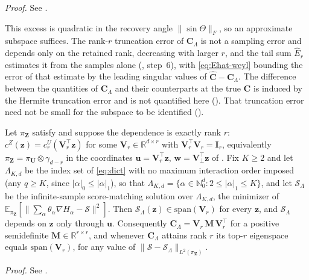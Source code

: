 \documentclass[review,hidelinks,onefignum,onetabnum]{siamart251216}
\newcommand{\RR}{\mathbb{R}}
\newcommand{\NN}{\mathbb{N}}
\newcommand{\EE}{\mathbb{E}}
\newcommand{\gauss}{\gamma}
\newcommand{\mC}{\bm{C}}
\newcommand{\hmC}{\widehat{\bm{C}}}
\newcommand{\mV}{\bm{V}}
\newcommand{\mI}{\bm{I}}
\newcommand{\vz}{\bm{z}}
\newcommand{\vZ}{\bm{Z}}
\newcommand{\vu}{\bm{u}}
\newcommand{\vU}{\bm{U}}
\newcommand{\vw}{\bm{w}}
\newcommand{\scS}{\mathcal{S}}
\begin{document}
\emph{Proof.} See .

This excess is quadratic in the recovery angle $\|\sin\Theta\|_F$, so an approximate subspace suffices. The rank-$r$ truncation error of $\mC_\Lambda$ is not a sampling error and depends only on the retained rank, decreasing with larger $r$, and the tail sum $\widehat E_r$ estimates it from the samples alone (, step~6), with \eqref{eq:Ehat-weyl} bounding the error of that estimate by the leading singular values of $\hmC - \mC_\Lambda$. The difference between the quantities of $\mC_\Lambda$ and their counterparts at the true $\mC$ is induced by the Hermite truncation error and is not quantified here (). That truncation error need not be small for the subspace to be identified ().

\begin{lemma}
\label{lem:pilot-subspace}
Let $\pi_{\vZ}$ satisfy  and suppose the dependence is exactly rank $r$: $c^{Z}(\vz) = c_r^{U}(\mV_r^\top\vz)$ for some $\mV_r \in \RR^{d\times r}$ with $\mV_r^\top\mV_r = \mI_r$, equivalently $\pi_{\vZ} = \pi_{\vU}\otimes\gauss_{d-r}$ in the coordinates $\vu = \mV_r^\top\vz$, $\vw = \mV_\perp^\top\vz$ of . Fix $K \geq 2$ and let $\Lambda_{K,d}$ be the index set of \eqref{eq:dict} with no maximum interaction order imposed (any $q \geq K$, since $|\alpha|_0 \le |\alpha|_1$), so that $\Lambda_{K,d} = \{\alpha \in \NN_0^d : 2 \le |\alpha|_1 \le K\}$, and let $\scS_\Lambda$ be the infinite-sample score-matching solution over $\Lambda_{K,d}$, the minimizer of $\EE_{\pi_{\vZ}}[\|\sum_{\alpha}\theta_\alpha\nabla H_\alpha - \scS\|^2]$. Then $\scS_\Lambda(\vz) \in \mathrm{span}(\mV_r)$ for every $\vz$, and $\scS_\Lambda$ depends on $\vz$ only through $\vu$. Consequently $\mC_\Lambda = \mV_r\,\mathbf M\,\mV_r^\top$ for a positive semidefinite $\mathbf M \in \RR^{r\times r}$, and whenever $\mC_\Lambda$ attains rank $r$ its top-$r$ eigenspace equals $\mathrm{span}(\mV_r)$, for any value of $\|\scS - \scS_\Lambda\|_{L^2(\pi_{\vZ})}$.
\end{lemma}

\emph{Proof.} See .
\end{document}
